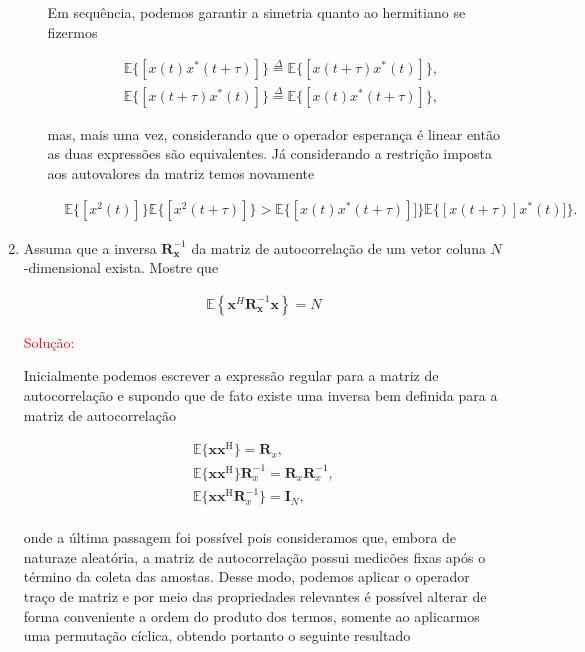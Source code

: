 \documentclass[a4paper,10pt]{article}
\begin{document}
\begin{enumerate}
\begin{enumerate}
						
						Em sequência, podemos garantir a simetria quanto ao hermitiano se fizermos 
						
						\begin{align}
							&\mathbb{E}\{[x(t)x^{*}(t + \tau)]\} \overset{\Delta}{=} \mathbb{E}\{[x(t + \tau)x^{*}(t)]\}, \\
							&\mathbb{E}\{[x(t + \tau)x^{*}(t)]\} \overset{\Delta}{=} \mathbb{E}\{[x(t)x^{*}(t + \tau)]\},
						\end{align}
						
						mas, mais uma vez, considerando que o operador esperança é linear então as duas expressões são equivalentes. Já considerando a
						restrição imposta aos autovalores da matriz temos novamente
						
						\begin{align}
							&\mathbb{E}\{[x^{2}(t)]\} \mathbb{E}\{[x^{2}(t + \tau)]\} > \mathbb{E}\{[x(t)x^{*}(t + \tau)]]\}  \mathbb{E}\{[x(t + \tau)]x^{*}(t)]\}.
						\end{align}
					
				\end{enumerate}
			
			\item Assuma que a inversa $\mathbf{R}_{\mathbf{x}}^{-1}$ da matriz de autocorrelação de um vetor coluna $N$-dimensional exista. Mostre que
			
				\begin{align}
					\mathbb{E}\left\{\mathbf{x}^H \mathbf{R}_{\mathbf{x}}^{-1} \mathbf{x} \right\} = N
				\end{align}
				
				\textcolor{red}{Solução:}
				
				Inicialmente podemos escrever a expressão regular para a matriz de autocorrelação e supondo que de fato existe uma inversa bem definida 
				para a matriz de autocorrelação
				
				\begin{align}
					\mathbb{E}\{\mathbf{x} \mathbf{x}^{\text{H}}\} = \mathbf{R}_{x}, \\
					\mathbb{E}\{\mathbf{x} \mathbf{x}^{\text{H}}\}\mathbf{R}^{-1}_{x} = \mathbf{R}_{x}\mathbf{R}^{-1}_{x}, \\
					\mathbb{E}\{\mathbf{x} \mathbf{x}^{\text{H}}\mathbf{R}^{-1}_{x}\} = \mathbf{I}_{N}, \\
				\end{align}
				
				onde a última passagem foi possível pois consideramos que, embora de naturaze aleatória, a matriz de autocorrelação possui medicões fixas 
				após o término da coleta das amostas. Desse modo, podemos aplicar o operador traço de matriz e por meio das propriedades relevantes é possível
				alterar de forma conveniente a ordem do produto dos termos, somente ao aplicarmos uma permutação cíclica, obtendo portanto o seguinte resultado
				

\end{enumerate}
\end{document}
